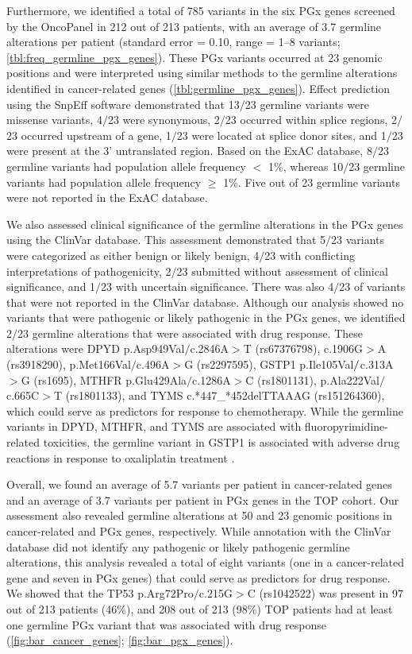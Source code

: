 Furthermore, we identified a total of 785 variants in the six PGx genes screened by the OncoPanel in 212 out of 213 patients, with an average of 3.7 germline alterations per patient (standard error = 0.10, range = 1--8 variants; \autoref{tbl:freq_germline_pgx_genes}). These PGx variants occurred at 23 genomic positions and were interpreted using similar methods to the germline alterations identified in cancer-related genes (\autoref{tbl:germline_pgx_genes}). Effect prediction using the SnpEff software demonstrated that 13$/$23 germline variants were missense variants, 4$/$23 were synonymous, 2$/$23 occurred within splice regions, 2$/$23 occurred upstream of a gene, 1$/$23 were located at splice donor sites, and 1$/$23 were present at the 3' untranslated region. Based on the ExAC database, 8$/$23 germline variants had population allele frequency $<$ 1\%, whereas 10$/$23 germline variants had population allele frequency $\geq$ 1\%. Five out of 23 germline variants were not reported in the ExAC database.

We also assessed clinical significance of the germline alterations in the PGx genes using the ClinVar database. This assessment demonstrated that 5$/$23 variants were categorized as either benign or likely benign, 4$/$23 with conflicting interpretations of pathogenicity, 2$/$23 submitted without assessment of clinical significance, and 1$/$23 with uncertain significance. There was also 4$/$23 of variants that were not reported in the ClinVar database. Although our analysis showed no variants that were pathogenic or likely pathogenic in the PGx genes, we identified 2$/$23 germline alterations that were associated with drug response. These alterations were \acs{DPYD} p.Asp949Val$/$c.2846A$>$T (rs67376798), c.1906G$>$A (rs3918290), p.Met166Val$/$c.496A$>$G (rs2297595), \acs{GSTP1} p.Ile105Val$\\/$c.313A$>$G (rs1695), \acs{MTHFR} p.Glu429Ala$/$c.1286A$>$C (rs1801131), p.Ala222Val$/$c.665C$>$T (rs1801133), and \acs{TYMS} c.*447\_*452delTTAAAG (rs151264360), which could serve as predictors for response to chemotherapy. While the germline variants in \acs{DPYD}, \acs{MTHFR}, and \acs{TYMS} are associated with fluoropyrimidine-related toxicities, the germline variant in \acs{GSTP1} is associated with adverse drug reactions in response to oxaliplatin treatment \cite{Panczyk2014, Mohelnikova-Duchonova2014}.

Overall, we found an average of 5.7 variants per patient in cancer-related genes and an average of 3.7 variants per patient in PGx genes in the TOP cohort. Our assessment also revealed germline alterations at 50 and 23 genomic positions in cancer-related and PGx genes, respectively. While annotation with the ClinVar database did not identify any pathogenic or likely pathogenic germline alterations, this analysis revealed a total of eight variants (one in a cancer-related gene and seven in PGx genes) that could serve as predictors for drug response. We showed that the \acs{TP53} p.Arg72Pro$/$c.215G$>$C (rs1042522) was present in 97 out of 213 patients (46\%), and 208 out of 213 (98\%) TOP patients had at least one germline PGx variant that was associated with drug response (\autoref{fig:bar_cancer_genes}; \autoref{fig:bar_pgx_genes}).


